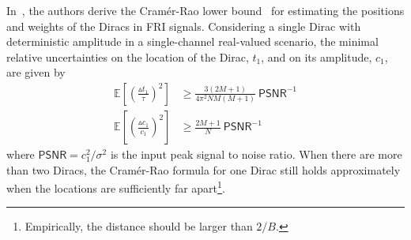 \documentclass[journal,10pt]{IEEEtran}
\providecommand{\Esp}[1]{\mathbb{E}\left[#1\right]}
\begin{document}
In~\cite{Blu2008}, the authors derive the Cram\'{e}r-Rao lower bound~\cite{Cramer1946, Rao1945} for estimating the positions and weights of the Diracs in FRI signals. Considering a single Dirac with deterministic amplitude in a single-channel real-valued scenario, the minimal relative uncertainties on the location of the Dirac, $t_1$, and on its amplitude, $c_1$, are given by
\begin{align*}
\label{chap2equ:singleframeCRB}
  \Esp{\left(\frac{\vartriangle\!\! t_1}{\tau}\right)^2}&\geq \frac{3(2M+1)}{4 \pi^2 N M(M+1)}\:\mathsf{PSNR}^{-1} \\
  \Esp{\left(\frac{\vartriangle\!\! c_1}{c_1}\right)^2}&\geq \frac{2M+1}{N}\:\mathsf{PSNR}^{-1} \nonumber
\end{align*}
where $\mathsf{PSNR} = c_1^2/\sigma^2$ is the input peak signal to noise ratio. When there are more than two Diracs, the Cram\'{e}r-Rao formula for one Dirac still holds approximately when the locations are sufficiently far apart\footnote{Empirically, the distance should be larger than $2/B$.}.
\end{document}
